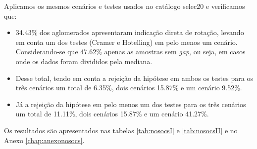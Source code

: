 Aplicamos os mesmos cenários e testes usados no catálogo selec20 e verificamos que:

\begin{itemize}
   	\item 34.43\% dos aglomerados apresentaram indicação direta de rotação, levando em conta um dos testes (Cramer e Hotelling) em pelo menos um cenário. Considerando-se que 47.62\% apenas as amostras sem \textit{gap}, ou seja, em casos onde os dados foram divididos pela mediana. 
   	\item Desse total, tendo em conta a rejeição da hipótese em ambos os testes para os três cenários um total de 6.35\%, dois cenários 15.87\% e um cenário 9.52\%.
   	\item Já a rejeição da hipótese em pelo menos um dos testes para os três cenários um total de 11.11\%, dois cenários 15.87\% e um cenário 41.27\%. 
 \end{itemize} 

 Os resultados são apresentados nas tabelas \ref{tab:nosocsI} e \ref{tab:nosocsII} e no Anexo \ref{chap:anexonosocs}. 

